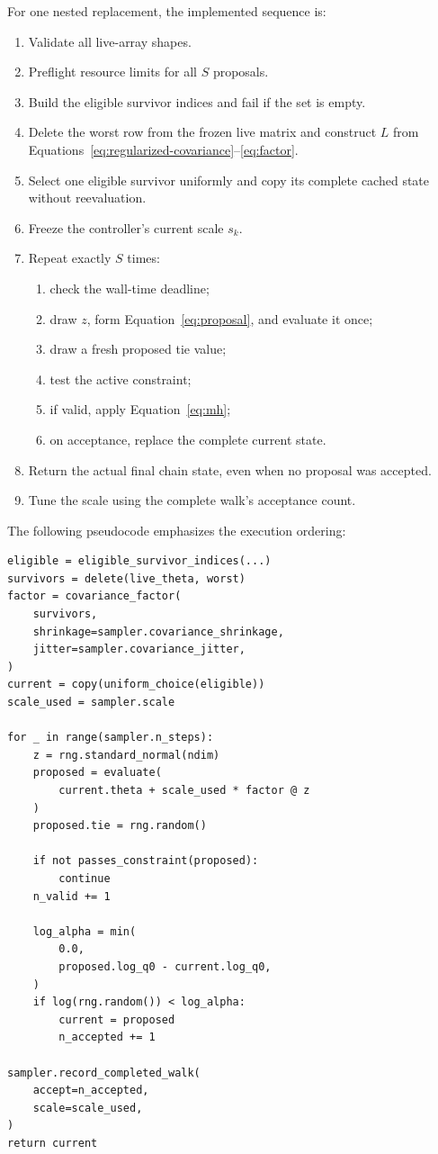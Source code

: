 \documentclass[11pt,a4paper]{article}
\begin{document}
For one nested replacement, the implemented sequence is:

\begin{enumerate}
  \item Validate all live-array shapes.
  \item Preflight resource limits for all \(S\) proposals.
  \item Build the eligible survivor indices and fail if the set is empty.
  \item Delete the worst row from the frozen live matrix and construct \(L\)
        from Equations~\eqref{eq:regularized-covariance}--\eqref{eq:factor}.
  \item Select one eligible survivor uniformly and copy its complete cached
        state without reevaluation.
  \item Freeze the controller's current scale \(s_k\).
  \item Repeat exactly \(S\) times:
    \begin{enumerate}
      \item check the wall-time deadline;
      \item draw \(z\), form Equation~\eqref{eq:proposal}, and evaluate it once;
      \item draw a fresh proposed tie value;
      \item test the active constraint;
      \item if valid, apply Equation~\eqref{eq:mh};
      \item on acceptance, replace the complete current state.
    \end{enumerate}
  \item Return the actual final chain state, even when no proposal was
        accepted.
  \item Tune the scale using the complete walk's acceptance count.
\end{enumerate}

The following pseudocode emphasizes the execution ordering:

\begin{lstlisting}
eligible = eligible_survivor_indices(...)
survivors = delete(live_theta, worst)
factor = covariance_factor(
    survivors,
    shrinkage=sampler.covariance_shrinkage,
    jitter=sampler.covariance_jitter,
)
current = copy(uniform_choice(eligible))
scale_used = sampler.scale

for _ in range(sampler.n_steps):
    z = rng.standard_normal(ndim)
    proposed = evaluate(
        current.theta + scale_used * factor @ z
    )
    proposed.tie = rng.random()

    if not passes_constraint(proposed):
        continue
    n_valid += 1

    log_alpha = min(
        0.0,
        proposed.log_q0 - current.log_q0,
    )
    if log(rng.random()) < log_alpha:
        current = proposed
        n_accepted += 1

sampler.record_completed_walk(
    accept=n_accepted,
    scale=scale_used,
)
return current
\end{lstlisting}
\end{document}
